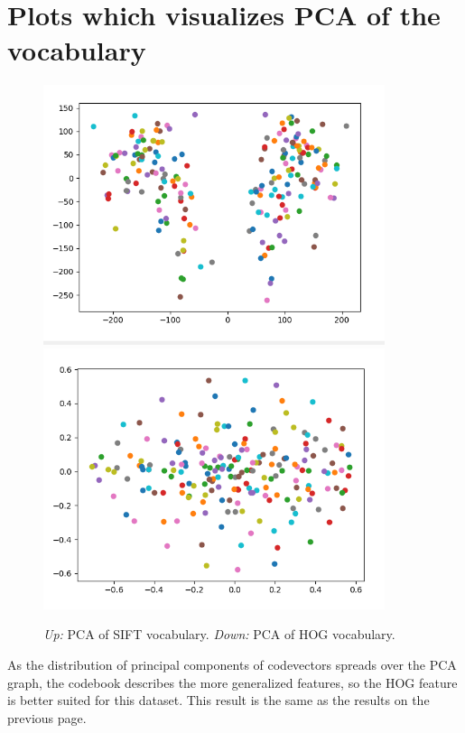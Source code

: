\pagebreak
\section*{Plots which visualizes PCA of the vocabulary}
\begin{figure}[h]
    \centering
    \includegraphics[width=10cm]{pca1.png}
    \includegraphics[width=10cm]{pca2.png}
    \caption{\emph{Up:} PCA of SIFT vocabulary. \emph{Down:} PCA of HOG vocabulary.}
    \label{fig:result1}
\end{figure}

As the distribution of principal components of codevectors spreads over the PCA graph, the codebook describes the more generalized features, so the HOG feature is better suited for this dataset. This result is the same as the results on the previous page.

\pagebreak
